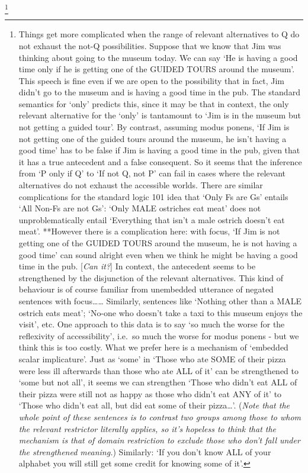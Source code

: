 \documentclass[If.tex]{subfiles}
\begin{document}
\footnote{Things get more complicated when the range of relevant alternatives to Q do not exhaust the not-Q possibilities. Suppose that we know that Jim was thinking about going to the museum today. We can say ‘He is having a good time only if he is getting one of the GUIDED TOURS around the museum’. This speech is fine even if we are open to the possibility that in fact, Jim didn't go to the museum and is having a good time in the pub. The standard semantics for ‘only’ predicts this, since it may be that in context, the only relevant alternative for the ‘only’ is tantamount to ‘Jim is in the museum but not getting a guided tour’. By contrast, assuming modus ponens, `If Jim is not getting one of the guided tours around the museum, he isn't having a good time' has to be false if Jim is having a good time in the pub, given that it has a true antecedent and a false consequent. So it seems that the inference from ‘P only if Q’ to ‘If not Q, not P’ can fail in cases where the relevant alternatives do not exhaust the accessible worlds. There are similar complications for the standard logic 101 idea that ‘Only Fs are Gs’ entails ‘All Non-Fs are not Gs’: ‘Only MALE ostriches eat meat’ does not unproblematically entail `Everything that isn't a male ostrich doesn't eat meat'. **However there is a complication here: with focus, ‘If Jim is not getting one of the GUIDED TOURS around the museum, he is not having a good time’ can sound alright even when we think he might be having a good time in the pub. {[}\emph{Can it?}{]} In context, the antecedent seems to be strengthened by the disjunction of the relevant alternatives. This kind of behaviour is of course familiar from unembedded utterance of negated sentences with focus\ldots{}\ldots{} Similarly, sentences like ‘Nothing other than a MALE ostrich eats meat’; `No-one who doesn't take a taxi to this museum enjoys the visit', etc. One approach to this data is to say ‘so much the worse for the reflexivity of accessibility’, i.e.~so much the worse for modus ponens - but we think this is too costly. What we prefer here is a mechanism of ‘embedded scalar implicature’. Just as ‘some’ in ‘Those who ate SOME of their pizza were less ill afterwards than those who ate ALL of it’ can be strengthened to ‘some but not all’, it seems we can strengthen `Those who didn't eat ALL of their pizza were still not as happy as those who didn't eat ANY of it' to `Those who didn't eat all, but did eat some of their pizza\ldots{}'. (\emph{Note that the whole point of these sentences is to contrast two groups among those to whom the relevant restrictor literally applies, so it's hopeless to think that the mechanism is that of domain restriction to exclude those who don't fall under the strengthened meaning.}) Similarly: `If you don't know ALL of your alphabet you will still get some credit for knowing some of it'.}
\end{document}
